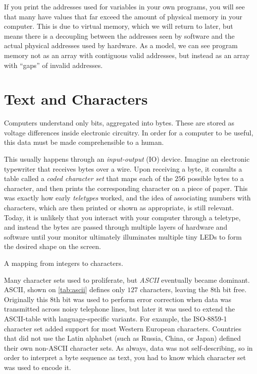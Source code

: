 If you print the addresses used for variables in your own programs,
you will see that many have values that far exceed the amount of
physical memory in your computer.  This is due to virtual memory,
which we will return to later, but means there is a decoupling between
the addresses seen by software and the actual physical addresses used
by hardware.  As a model, we can see program memory not as an array
with contiguous valid addresses, but instead as an array with ``gaps''
of invalid addresses.

\section{Text and Characters}
\label{sec:text}

Computers understand only bits, aggregated into bytes.  These are
stored as voltage differences inside electronic circuitry.  In order
for a computer to be useful, this data must be made comprehensible to
a human.

This usually happens through an \emph{input-output} (IO) device.
Imagine an electronic typewriter that receives bytes over a wire. Upon
receiving a byte, it consults a table called a \emph{coded character
  set} that maps each of the $256$ possible bytes to a character, and
then prints the corresponding character on a piece of paper. This was
exactly how early \emph{teletypes} worked, and the idea of associating
numbers with characters, which are then printed or shown as
appropriate, is still relevant. Today, it is unlikely that you
interact with your computer through a teletype, and instead the bytes
are passed through multiple layers of hardware and software until your
monitor ultimately illuminates multiple tiny LEDs to form the desired
shape on the screen.

\begin{definition}
  A mapping from integers to characters.
\end{definition}

Many character sets used to proliferate, but \emph{ASCII} eventually
became dominant.  ASCII, shown on \cref{tab:ascii} defines only $127$
characters, leaving the 8th bit free.  Originally this 8th bit was
used to perform error correction when data was transmitted across
noisy telephone lines, but later it was used to extend the ASCII-table
with language-specific variants.  For example, the ISO-8859-1
character set added support for most Western European characters.
Countries that did not use the Latin alphabet (such as Russia, China,
or Japan) defined their own non-ASCII character sets.  As always, data
was not self-describing, so in order to interpret a byte sequence as
text, you had to know which character set was used to encode it.

